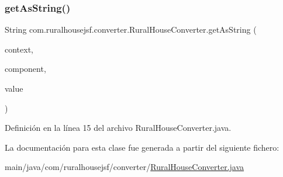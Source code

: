 \subsubsection{\texorpdfstring{getAsString()}{getAsString()}}
{\footnotesize\ttfamily String com.\+ruralhousejsf.\+converter.\+Rural\+House\+Converter.\+get\+As\+String (\begin{DoxyParamCaption}\item[{Faces\+Context}]{context,  }\item[{U\+I\+Component}]{component,  }\item[{Object}]{value }\end{DoxyParamCaption})}



Definición en la línea 15 del archivo Rural\+House\+Converter.\+java.



La documentación para esta clase fue generada a partir del siguiente fichero\+:\begin{DoxyCompactItemize}
\item 
main/java/com/ruralhousejsf/converter/\mbox{\hyperlink{_rural_house_converter_8java}{Rural\+House\+Converter.\+java}}\end{DoxyCompactItemize}
